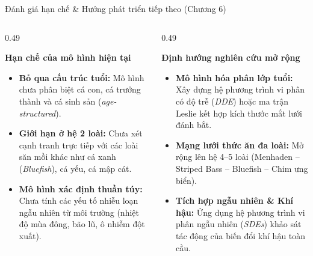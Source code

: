 \documentclass[aspectratio=169, 10pt]{beamer}
\begin{document}
\begin{frame}{Đánh giá hạn chế \& Hướng phát triển tiếp theo (Chương 6)}
  \begin{columns}[t]
    \begin{column}{0.49\textwidth}
      \begin{alertblock}{\textbf{Hạn chế của mô hình hiện tại}}
        \footnotesize
        \begin{itemize}
          \item \textbf{Bỏ qua cấu trúc tuổi:} Mô hình chưa phân biệt cá con, cá trưởng thành và cá sinh sản (\textit{age-structured}).
          \item \textbf{Giới hạn ở hệ 2 loài:} Chưa xét cạnh tranh trực tiếp với các loài săn mồi khác như cá xanh (\textit{Bluefish}), cá yếu, cá mập cát.
          \item \textbf{Mô hình xác định thuần túy:} Chưa tính các yếu tố nhiễu loạn ngẫu nhiên từ môi trường (nhiệt độ mùa đông, bão lũ, ô nhiễm đột xuất).
        \end{itemize}
      \end{alertblock}
    \end{column}

    \begin{column}{0.49\textwidth}
      \begin{exampleblock}{\textbf{Định hướng nghiên cứu mở rộng}}
        \footnotesize
        \begin{itemize}
          \item \textbf{Mô hình hóa phân lớp tuổi:} Xây dựng hệ phương trình vi phân có độ trễ (\textit{DDE}) hoặc ma trận Leslie kết hợp kích thước mắt lưới đánh bắt.
          \item \textbf{Mạng lưới thức ăn đa loài:} Mở rộng lên hệ 4--5 loài (Menhaden -- Striped Bass -- Bluefish -- Chim ưng biển).
          \item \textbf{Tích hợp ngẫu nhiên \& Khí hậu:} Ứng dụng hệ phương trình vi phân ngẫu nhiên (\textit{SDEs}) khảo sát tác động của biến đổi khí hậu toàn cầu.
        \end{itemize}
      \end{exampleblock}
    \end{column}
  \end{columns}
\end{frame}
\end{document}
